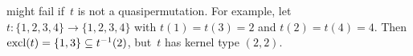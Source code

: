 \begin{remark} 
	might fail if~$t$ is not a quasipermutation.
	For example, let $t \colon \{1,2,3,4\} \to \{1,2,3,4\}$
	with $t(1) = t(3) = 2$ and $t(2) = t(4) = 4$.
	Then $\operatorname{excl}(t) = \{1,3\} \subseteq t^{-1}(2)$,
	but~$t$ has kernel type $(2,2)$.
\end{remark}

%




